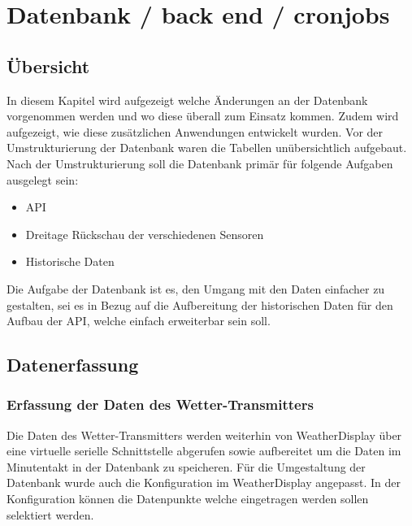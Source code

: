 \section{Datenbank / back end / cronjobs}

\subsection{Übersicht}

In diesem Kapitel wird aufgezeigt welche Änderungen an der Datenbank vorgenommen werden und wo diese überall zum Einsatz kommen. Zudem wird aufgezeigt, wie diese zusätzlichen Anwendungen entwickelt wurden. Vor der Umstrukturierung der Datenbank waren die Tabellen unübersichtlich aufgebaut. Nach der Umstrukturierung soll die Datenbank primär für folgende Aufgaben ausgelegt sein:\\
\begin{itemize}
\item API
\item Dreitage Rückschau der verschiedenen Sensoren
\item Historische Daten
\end{itemize}

Die Aufgabe der Datenbank ist es, den Umgang mit den Daten einfacher zu gestalten, sei es in Bezug auf die Aufbereitung der historischen Daten für den Aufbau der API, welche einfach erweiterbar sein soll.



\subsection{Datenerfassung}
\subsubsection{Erfassung der Daten des Wetter-Transmitters}
Die Daten des Wetter-Transmitters werden weiterhin von WeatherDisplay über eine virtuelle serielle Schnittstelle abgerufen sowie aufbereitet um die Daten im Minutentakt in der Datenbank zu speicheren. Für die Umgestaltung der Datenbank wurde auch die Konfiguration im WeatherDisplay angepasst.  In der Konfiguration können die Datenpunkte welche eingetragen werden sollen selektiert werden. 

